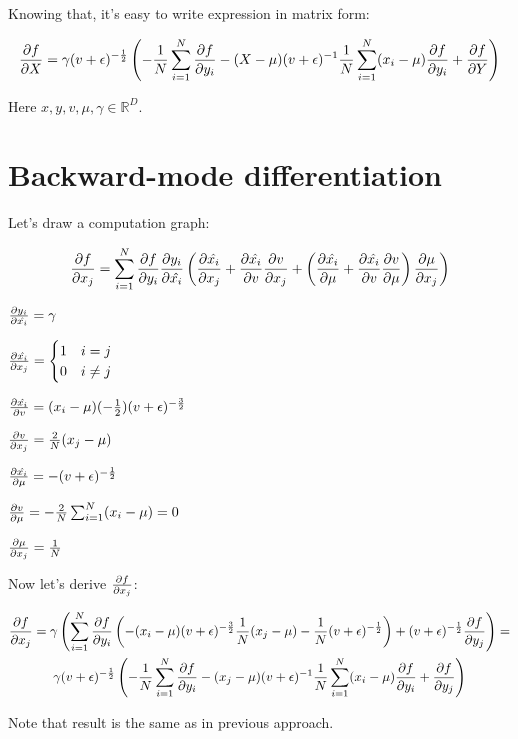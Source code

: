 \documentclass[12pt]{article}
\begin{document}
Knowing that, it's easy to write expression in matrix form:

\[
	\pdv{f}{X} = \gamma (v + \epsilon)^{-\frac{1}{2}} \left( -\frac{1}{N} \sum_{i=1}^{N} \pdv{f}{y_i} - (X - \mu) (v + \epsilon)^{-1} \frac{1}{N} \sum_{i=1}^{N} (x_i - \mu) \pdv{f}{y_i} + \pdv{f}{Y} \right) 
\]

Here $x, y, v, \mu, \gamma \in \mathbb{R}^D$.

\section{Backward-mode differentiation}

Let's draw a computation graph:


\[
	\pdv{f}{x_j} = 
	\sum_{i=1}^{N}
	\pdv{f}{y_i}
	\pdv{y_i}{\hat{x_i}} 
	\left( 
		\pdv{\hat{x_i}}{x_j} + 
		\pdv{\hat{x_i}}{v}\pdv{v}{x_j} + 
		\left( 
			\pdv{\hat{x_i}}{\mu} + 
			\pdv{\hat{x_i}}{v} \pdv{v}{\mu} 
		\right) 
		\pdv{\mu}{x_j} 
	\right) 
\]

$\pdv{y_i}{\hat{x_i}} = \gamma$

$
\pdv{\hat{x_i}}{x_j} = 
\begin{cases}
1 & \text{$i = j$} \\
0 & \text{$i \ne j$}
\end{cases}
$

$\pdv{\hat{x_i}}{v} = (x_i - \mu) (- \frac{1}{2}) (v + \epsilon)^{-\frac{3}{2}}$

$\pdv{v}{x_j} = \frac{2}{N} (x_j - \mu)$

$\pdv{\hat{x_i}}{\mu} = - (v + \epsilon)^{-\frac{1}{2}}$

$\pdv{v}{\mu} = - \frac{2}{N} \sum_{i=1}^{N} (x_i - \mu) = 0$

$\pdv{\mu}{x_j} = \frac{1}{N}$

Now let's derive $\pdv{f}{x_j}$:

\begin{gather*}
\pdv{f}{x_j} = 
	\gamma 
	\left(
		\sum_{i=1}^{N} \pdv{f}{y_i} 
			\left( 
				- (x_i - \mu) (v + \epsilon)^{-\frac{3}{2}} \frac{1}{N} (x_j - \mu) - \frac{1}{N} (v + \epsilon)^{-\frac{1}{2}}
			\right) 
			+ (v + \epsilon)^{-\frac{1}{2}} \pdv{f}{y_j}
	\right) = \\
	\gamma (v + \epsilon)^{-\frac{1}{2}} 
	\left(	
		- \frac{1}{N} \sum_{i=1}^{N} \pdv{f}{y_i}
		- (x_j - \mu) (v + \epsilon)^{-1} \frac{1}{N} \sum_{i=1}^{N} (x_i - \mu) \pdv{f}{y_i} 
		+ \pdv{f}{y_j}
	\right)
\end{gather*}

Note that result is the same as in previous approach.
\end{document}
